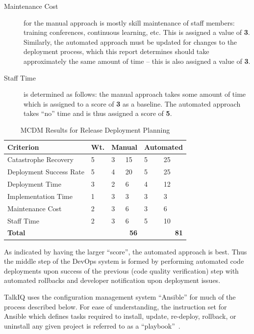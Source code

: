 \documentclass[12pt]{article}
\begin{document}
\begin{description}
\item[Maintenance Cost] for the manual approach is mostly skill maintenance of staff members: training conferences, continuous learning, etc. This is assigned a value of {\bf 3}. Similarly, the automated approach must be updated for changes to the deployment process, which this report determines should take approximately the same amount of time -- this is also assigned a value of {\bf 3}.
\item[Staff Time] is determined as follows: the manual approach takes some amount of time which is assigned to a score of {\bf 3} as a baseline. The automated approach takes ``no'' time and is thus assigned a score of {\bf 5}.
\end{description}

\begin{table}[ht]
\caption{MCDM Results for Release Deployment Planning}
\label{tbl:mcdm-rdp}
\centering
\begin{tabular}{|p{5.0cm}|p{0.65cm}|p{0.5cm}|p{0.5cm}|p{0.8cm}|p{0.8cm}|}
    \hline
    {\bf Criterion} & {\bf Wt.} & \multicolumn{2}{|p{1cm}|}{{\bf Manual}} & \multicolumn{2}{|p{1.6cm}|}{{\bf \mbox{Automated}}} \\
    \hline
    \hline
    Catastrophe Recovery    &  5 & 3 & 15 & 5 & 25 \\
    Deployment Success Rate &  5 & 4 & 20 & 5 & 25 \\
    Deployment Time         &  3 & 2 &  6 & 4 & 12 \\
    Implementation Time     &  1 & 3 &  3 & 3 &  3 \\
    Maintenance Cost        &  2 & 3 &  6 & 3 &  6 \\
    Staff Time              &  2 & 3 &  6 & 5 & 10 \\
    \hline
    \hline
    {\bf Total}             &    & \multicolumn{2}{|r|}{{\bf 56}} & \multicolumn{2}{|r|}{{\bf 81}} \\
    \hline
\end{tabular}
\end{table}

As indicated by having the larger ``score'', the automated approach is best. Thus the middle step of the DevOps system is formed by performing automated code deployments upon success of the previous (code quality verification) step with automated rollbacks and developer notification upon deployment issues.

TalkIQ uses the configuration management system ``Ansible'' for much of the process described below. For ease of understanding, the instruction set for Ansible which defines tasks required to install, update, re-deploy, rollback, or uninstall any given project is referred to as a ``playbook''~\cite{playbooks}.
\end{document}
